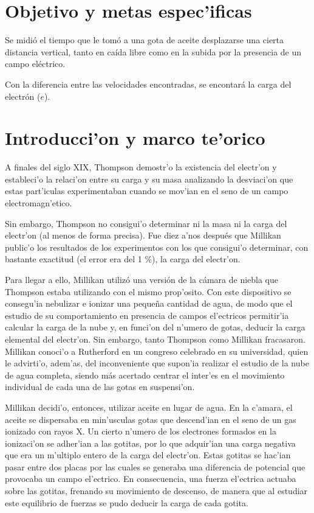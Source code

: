 \documentclass{article}
\begin{document}
\begin{multicols}{2}

\section*{Objetivo y metas espec'ificas}\label{Objetivo}                                           	%

Se midió el tiempo que le tomó a una gota de aceite desplazarse una cierta distancia vertical, tanto en caída libre como en la subida por la presencia de un campo eléctrico.


Con la diferencia entre las velocidades encontradas, se encontará la carga del electrón ($e$).

\section*{Introducci'on y marco te'orico}\label{Introduccion}                              	%
A finales del siglo XIX, Thompson demostr'o la existencia del electr'on y estableci'o la relaci'on entre su carga y su masa analizando la desviaci'on que estas part'iculas experimentaban cuando se mov'ian en el seno de un campo electromagn'etico.

Sin embargo, Thompson no consigui'o determinar ni la masa ni la carga del electr'on (al menos de forma precisa). Fue diez a'nos después que Millikan public'o los resultados de los experimentos con los que consigui'o determinar, con bastante exactitud (el error era del 1 \%), la carga del electr'on.

Para llegar a ello, Millikan utilizó una versión de la cámara de niebla que Thompson estaba utilizando con el mismo prop'osito. Con este dispositivo se consegu'ia nebulizar e ionizar una pequeña cantidad de agua, de modo que el estudio de su comportamiento en presencia de campos el'ectricos permitir'ia calcular la carga de la nube y, en funci'on del n'umero de gotas, deducir la carga elemental del electr'on. Sin embargo, tanto Thompson como Millikan fracasaron. Millikan conoci'o a Rutherford en un congreso celebrado en su universidad, quien le advirti'o, adem'as, del inconveniente que supon'ia realizar el estudio de la nube de agua completa, siendo más acertado centrar el inter'es en el movimiento individual de cada una de las gotas en suspensi'on.

Millikan decidi'o, entonces, utilizar aceite en lugar de agua. En la c'amara, el aceite se dispersaba en min'usculas gotas que descend'ian en el seno de un gas ionizado con rayos X. Un cierto n'umero de los electrones formados en la ionizaci'on se adher'ian a las gotitas, por lo que adquir'ian una carga negativa que era un m'ultiplo entero de la carga del electr'on. Estas gotitas se hac'ian pasar entre dos placas por las cuales se generaba una diferencia de potencial que provocaba un campo el'ectrico. En consecuencia, una fuerza el'ectrica actuaba sobre las gotitas, frenando su movimiento de descenso, de manera que al estudiar este equilibrio de fuerzas se pudo deducir la carga de cada gotita. 



\end{multicols}
\end{document}

